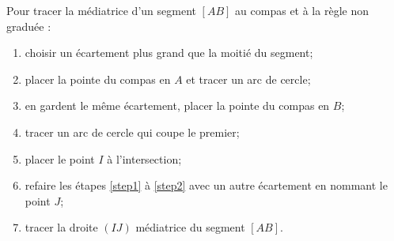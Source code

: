 \documentclass[12pt,a4paper]{article}
\begin{document}
\begin{mymeth}
Pour tracer la médiatrice d'un segment $[AB]$ au compas et à la règle non graduée :

\begin{enumerate}
	\item choisir un écartement plus grand que la moitié du segment;
	\item placer la pointe du compas en $A$ et tracer un arc de cercle;\label{step1}
	\item en gardent le même écartement, placer la pointe du compas en $B$;
	\item tracer un arc de cercle qui coupe le premier;
	\item placer le point $I$ à l'intersection;\label{step2}
	\item refaire les étapes \ref{step1} à \ref{step2} avec un autre écartement en nommant le point $J$;
	\item tracer la droite $(IJ)$ médiatrice du segment $[AB]$.
	
\end{enumerate}
\end{mymeth}
\end{document}
